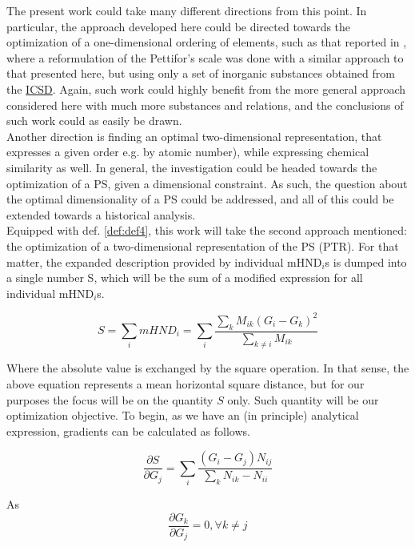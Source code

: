\documentclass[article]{article}
\begin{document}
The present work could take many different directions from this point. In particular, the approach developed here could be directed towards the optimization of a one-dimensional ordering of elements, such as that reported in \cite{Glawe_2016}, where a reformulation of the Pettifor's scale was done with a similar approach to that presented here, but using only a set of inorganic substances obtained from the \href{https://ucsd.libguides.com/crystallography/icsd}{ICSD}. Again, such work could highly benefit from the more general approach considered here with much more substances and relations, and the conclusions of such work could as easily be drawn.\\


Another direction is finding an optimal two-dimensional representation, that expresses a given order e.g. by atomic number), while expressing chemical similarity as well. In general, the investigation could be headed towards the optimization of a PS, given a dimensional constraint. As such, the question about the optimal dimensionality of a PS could be addressed, and all of this could be extended towards a historical analysis.\\

Equipped with def. \ref{def:def4}, this work will take the second approach mentioned: the optimization of a two-dimensional representation of the PS (PTR). For that matter, the expanded description provided by individual mHND$_i$s is dumped into a single number S, which will be the sum of a modified expression for all individual mHND$_i$s.

\begin{equation}
\label{eq:eq1}
	S = \sum_i mHND_i = \sum_i \frac{\sum_k M_{ik} (G_i - G_k)^2}{\sum_{k \neq i} M_{ik}}
\end{equation}

Where the absolute value is exchanged by the square operation. In that sense, the above equation represents a mean horizontal square distance, but for our purposes the focus will be on the quantity $S$ only. Such quantity will be our optimization objective. To begin, as we have an (in principle) analytical expression, gradients can be calculated as follows.

\begin{equation}
\frac{\partial S}{\partial G_j} = \sum_i \frac{ ( G_i - G_j ) N_{ij} }{\sum_k N_{ik} - N_{ii}}
\end{equation}

As \\
$$
\frac{\partial G_{k}}{\partial G_j} = 0, \forall k \neq j
$$
\end{document}
